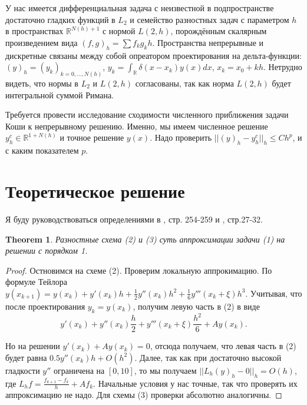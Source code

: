 \documentclass[12 pt, russian]{article}
\def\bbr{{\mathbb R}}
\newtheorem{theo}{Theorem}[section]
\newcommand\beq{\begin{equation}}
\newcommand\eeq{\end{equation}}
\begin{document}
У нас имеется дифференциальная задача с неизвестной в подпространстве достаточно гладких функций в $L_2$ и семейство разностных задач с параметром $h$ в пространствах $\bbr ^ {N(h)+1}$ с нормой $L(2, h)$, порождённым скалярным произведением вида $(f, g)_h = \sum{f_k g_k h}$. Пространства непрерывные и дискретные связаны между собой опреатором проектирования на дельта-функции: $(y)_h = ( y_k )_{k = 0 , \dots, N(h)}$,
$y_k = \int_\bbr{ \delta(x - x_k) y(x) dx}$, $x_k = x_0 + kh$.  Нетрудно видеть, что нормы в $L_2$ и $L(2, h)$ согласованы, так как норма $L(2, h)$ будет интегральной суммой Римана. 

Требуется провести исследование сходимости численного приближения задачи Коши к непрерывному решению. Именно, мы имеем численное решение $y^c_h \in \bbr^{1+N(h)}$ и точное решение $y(x)$. Надо проверить $||(y)_h - y^c_h||_h \leq Ch^p$, и с каким показателем $p$. 

\section{Теоретическое решение}

Я буду руководствоваться определениями в \cite{Kornev1}, стр. 254-259 и \cite{Kornev2}, стр.27-32.

\begin{theo}
Разностные схема (2) и (3) суть аппроксимации задачи (1) на решении с порядком 1.
\end{theo}
\begin{proof}
Остновимся на схеме (2). Проверим локальную аппрокимацию. По формуле Тейлора $y(x_{k+1}) = y(x_k) + y'(x_k) h + \frac{1}{2} y''(x_k) h^2 + \frac{1}{6} y'''(x_k + \xi) h^3$. Учитывая, что после проектирования $y_k = y(x_k)$, получим левую часть в (2) в виде 
\beq
y'(x_k) + y''(x_k) \frac{h}{2} + y'''(x_k + \xi) \frac{h^2}{6} + A y(x_k).
\eeq

Но на решении $y'(x_k) + Ay(x_k) = 0$, отсюда получаем, что левая часть в (2) будет равна $0.5 y''(x_k)h + O(h^2)$. Далее, так как при достаточно высокой гладкости $y''$ ограничена на $[0, 10]$, то мы получаем $||L_h (y)_h - 0||_h = O(h)$, где $L_h f = \frac{f_{k+1} - f_k}{h} + Af_k$. 
Начальные условия у нас точные, так что проверять их аппроксимацию не надо.
Для схемы (3) проверки абсолютно аналогичны.
\end{proof} 
\end{document}
